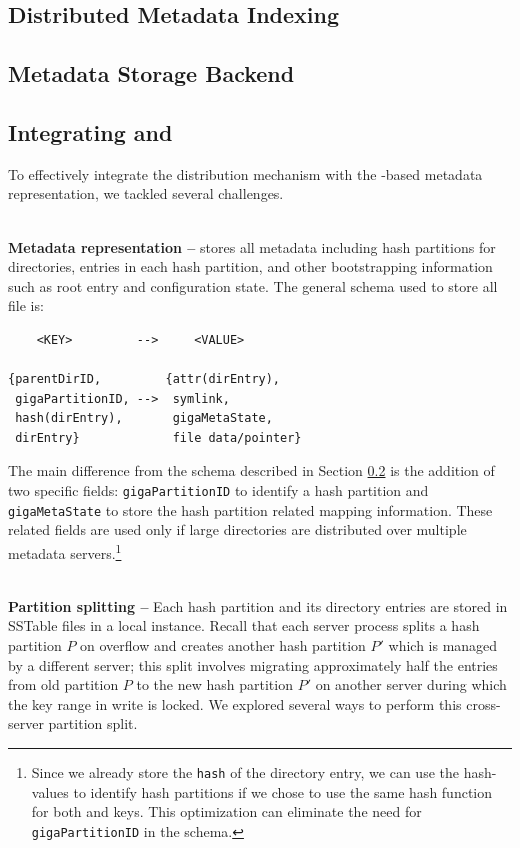 \subsection{Distributed Metadata Indexing}
\label{design.giga}


\subsection{Metadata Storage Backend}
\label{design.tablefs}


\subsection{Integrating \giga{} and \tfs{}}
\label{design.integration}

To effectively integrate the \giga{} distribution mechanism with the
\tfs-based metadata representation, we tackled several challenges. 

~\\
\textbf{Metadata representation -- }
\tfs stores all metadata including \giga{} hash
partitions for directories, entries in each hash partition, and other
bootstrapping information such as root entry and \giga{} configuration state.
The general schema used to store all file is:

\begin{verbatim}
    <KEY>         -->     <VALUE>

{parentDirID,         {attr(dirEntry),
 gigaPartitionID, -->  symlink,
 hash(dirEntry),       gigaMetaState,
 dirEntry}             file data/pointer}
\end{verbatim}

The main difference from the \tfs schema described in Section
\ref{design.tablefs} is the addition of two \giga specific fields: 
\texttt{gigaPartitionID} to identify a
\giga{} hash partition and \texttt{gigaMetaState} to store the
hash partition related mapping information. These \giga{} related fields are 
used only if large directories are distributed over multiple metadata servers.\footnote{
Since we already store the \texttt{hash} of the directory entry, we can use the
hash-values to identify hash partitions if we chose to use the same hash
function for both \giga and \ldb keys. This optimization can eliminate the
need for \texttt{gigaPartitionID} in the schema.} 

~\\
\textbf{Partition splitting -- }
Each \giga{} hash partition and its directory entries are stored in 
SSTable files in a local \tfs instance. 
Recall that each \giga{} server process splits a hash partition $P$ on 
overflow and creates another hash partition $P'$ which is managed by a 
different server; this split involves migrating approximately half the entries 
from old partition $P$ to the new hash partition $P'$ on another server during
which the key range in write is locked.
We explored several ways to perform this cross-server partition split.

